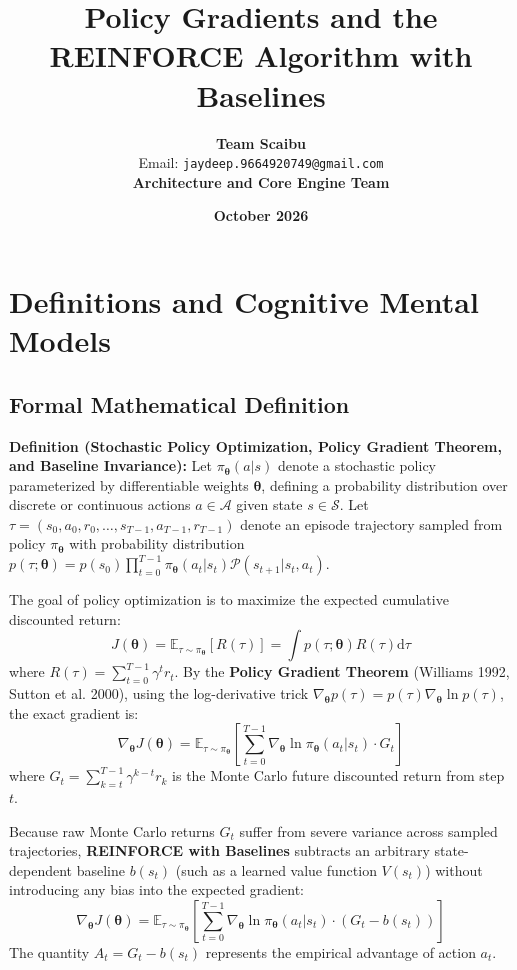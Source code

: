 \documentclass[11pt,a4paper]{article}
\title{\textbf{Policy Gradients and the REINFORCE Algorithm with Baselines}}
\author{\textbf{Team Scaibu} \\ \small Email: \texttt{jaydeep.9664920749@gmail.com} \\ \small \textbf{Architecture and Core Engine Team}}
\date{\textbf{October 2026}}
\theoremstyle{definition}
\begin{document}
\maketitle

\section{Definitions and Cognitive Mental Models}

\subsection{Formal Mathematical Definition}
\textbf{Definition (Stochastic Policy Optimization, Policy Gradient Theorem, and Baseline Invariance):}
Let $\pi_{\boldsymbol{\theta}}(a | s)$ denote a stochastic policy parameterized by differentiable weights $\boldsymbol{\theta}$, defining a probability distribution over discrete or continuous actions $a \in \mathcal{A}$ given state $s \in \mathcal{S}$. Let $\tau = (s_0, a_0, r_0, \dots, s_{T-1}, a_{T-1}, r_{T-1})$ denote an episode trajectory sampled from policy $\pi_{\boldsymbol{\theta}}$ with probability distribution $p(\tau; \boldsymbol{\theta}) = p(s_0) \prod_{t=0}^{T-1} \pi_{\boldsymbol{\theta}}(a_t | s_t) \mathcal{P}(s_{t+1} | s_t, a_t)$.

The goal of policy optimization is to maximize the expected cumulative discounted return:
{\boldmath
\begin{equation}
J(\boldsymbol{\theta}) = \mathbb{E}_{\tau \sim \pi_{\boldsymbol{\theta}}} [R(\tau)] = \int p(\tau; \boldsymbol{\theta}) R(\tau) \mathrm{d}\tau
\end{equation}
}
where $R(\tau) = \sum_{t=0}^{T-1} \gamma^t r_t$. By the \textbf{Policy Gradient Theorem} (Williams 1992, Sutton et al. 2000), using the log-derivative trick $\nabla_{\boldsymbol{\theta}} p(\tau) = p(\tau) \nabla_{\boldsymbol{\theta}} \ln p(\tau)$, the exact gradient is:
{\boldmath
\begin{equation}
\nabla_{\boldsymbol{\theta}} J(\boldsymbol{\theta}) = \mathbb{E}_{\tau \sim \pi_{\boldsymbol{\theta}}} \left[ \sum_{t=0}^{T-1} \nabla_{\boldsymbol{\theta}} \ln \pi_{\boldsymbol{\theta}}(a_t | s_t) \cdot G_t \right]
\end{equation}
}
where $G_t = \sum_{k=t}^{T-1} \gamma^{k-t} r_k$ is the Monte Carlo future discounted return from step $t$.

Because raw Monte Carlo returns $G_t$ suffer from severe variance across sampled trajectories, \textbf{REINFORCE with Baselines} subtracts an arbitrary state-dependent baseline $b(s_t)$ (such as a learned value function $V(s_t)$) without introducing any bias into the expected gradient:
{\boldmath
\begin{equation}
\nabla_{\boldsymbol{\theta}} J(\boldsymbol{\theta}) = \mathbb{E}_{\tau \sim \pi_{\boldsymbol{\theta}}} \left[ \sum_{t=0}^{T-1} \nabla_{\boldsymbol{\theta}} \ln \pi_{\boldsymbol{\theta}}(a_t | s_t) \cdot \left( G_t - b(s_t) \right) \right]
\end{equation}
}
The quantity $A_t = G_t - b(s_t)$ represents the empirical advantage of action $a_t$.
\end{document}
